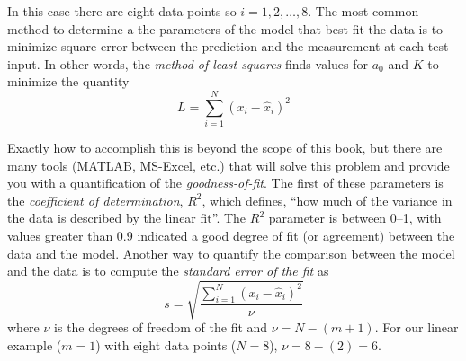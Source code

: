 In this case there are eight data points so $i=1,2,\ldots,8$.  The most common method to determine a the parameters of the model that best-fit the data is to minimize square-error between the prediction and the measurement at each test input.  In other words, the \emph{method of least-squares} finds values for $a_0$ and $K$ to minimize the quantity
\begin{equation}
L = \sum_{i=1}^N \left(x_i - \hat{x}_i \right)^2
\end{equation}


Exactly how to accomplish this is beyond the scope of this book, but there are many tools (MATLAB, MS-Excel, etc.) that will solve this problem and provide you with a quantification of the \emph{goodness-of-fit}.  The first of these parameters is the \emph{coefficient of determination}, $R^2$, which defines, ``how much of the variance in the data is described by the linear fit''.  The $R^2$ parameter is between 0--1, with values greater than 0.9 indicated a good degree of fit (or agreement) between the data and the model.  Another way to quantify the comparison between the model and the data is to compute the \emph{standard error of the fit} as
\begin{equation}\label{e:standerror}
s = \sqrt{\frac{\sum_{i=1}^N \left(x_i - \hat{x}_i \right)^2}{\nu}}
\end{equation}
where $\nu$ is the degrees of freedom of the fit and $\nu=N-(m+1)$.  For our linear example ($m=1$) with eight data points ($N=8$), $\nu=8-(2)=6$. 
